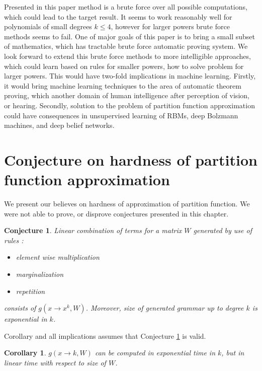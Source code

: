 \documentclass{article}
\newtheorem{conjecture}[theorem]{Conjecture}
\newtheorem{corollary}[theorem]{Corollary}
\begin{document}
Presented in this paper method is a brute force over all possible computations, 
which could lead to the target result. It seems to work reasonably well
for polynomials of small degrees $k \leq 4$, however for larger powers 
brute force methods seems to fail. One of major goals of this paper is to
bring a small subset of mathematics, which has tractable brute force automatic proving
system. We look forward to extend this brute force methods to more intelligible approaches, which
could learn based on rules for smaller powers, how to solve problem for larger powers. This would
have two-fold implications in machine learning. Firstly, it would bring machine learning techniques
to the area of automatic theorem proving, which another domain of human intelligence after perception
of vision, or hearing. Secondly, solution to the problem of partition function approximation
could have consequences in unsupervised learning of RBMs, deep Bolzmann machines, and deep
belief networks. 

\section{Conjecture on hardness of partition function approximation}

We present our believes on hardness of approximation of partition function. 
We were not able to prove, or disprove conjectures presented in this chapter.

\begin{conjecture}
Linear combination of terms for a matrix $W$ generated by use of rules :
\begin{itemize}
	\item element wise multiplication
	\item marginalization
	\item repetition
\end{itemize}
consists of $g(x \rightarrow x^k, W)$. Moreover, size of generated grammar
up to degree $k$ is exponential in $k$.
\label{simple}
\end{conjecture}

Corollary and all implications assumes that Conjecture \ref{simple} is valid.

\begin{corollary}
	$g(x \rightarrow k, W)$
	can be computed in exponential time in $k$, but in linear time with respect to size of $W$.
\end{corollary}
\end{document}

